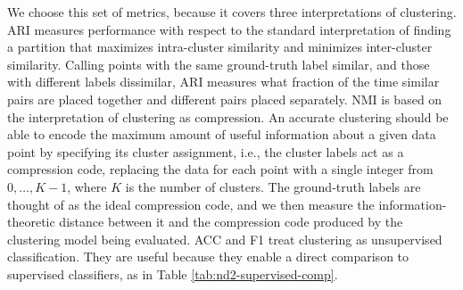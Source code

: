 \documentclass[wcp]{jmlr}
\begin{document}
 We choose this set of metrics, because it covers three interpretations of clustering. ARI measures performance with respect to the standard interpretation of finding a partition that maximizes intra-cluster similarity and minimizes inter-cluster similarity. Calling points with the same ground-truth label similar, and those with different labels dissimilar, ARI measures what fraction of the time similar pairs are placed together and different pairs placed separately.
NMI is based on the interpretation of clustering as compression. An accurate clustering should be able to encode the maximum amount of useful information about a given data point by specifying its cluster assignment, i.e., the cluster labels act as a compression code, replacing the data for each point with a single integer from $0, \dots, K-1$, where $K$ is the number of clusters. The ground-truth labels are thought of as the ideal compression code, and we then measure the information-theoretic distance between it and the compression code produced by the clustering model being evaluated.
ACC and F1 treat clustering as unsupervised classification. They are useful because they enable a direct comparison to supervised classifiers, as in Table \ref{tab:nd2-supervised-comp}. 
\end{document}
